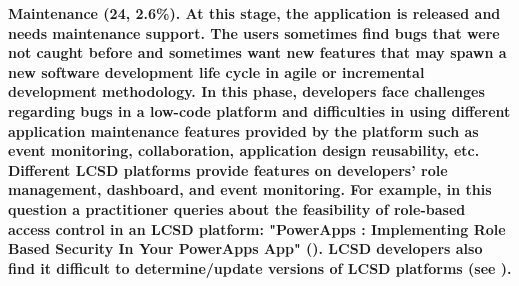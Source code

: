 \bf{Maintenance (24, 2.6\%).} At this stage, the application is released and needs maintenance support. The users sometimes find bugs that were not caught before and sometimes want new features that may spawn a new software development life cycle in agile or incremental development methodology. In this phase, developers face challenges regarding bugs in a low-code platform and difficulties in using different application maintenance features provided by the platform such as event monitoring, collaboration, application design reusability, etc. Different LCSD platforms provide features on developers' role management, dashboard, and event monitoring. For example, in this question a practitioner queries about the feasibility of role-based access control in an LCSD platform: "PowerApps : Implementing Role Based Security In Your PowerApps App" (). LCSD developers also find it difficult to determine/update versions of LCSD platforms (see ). 


